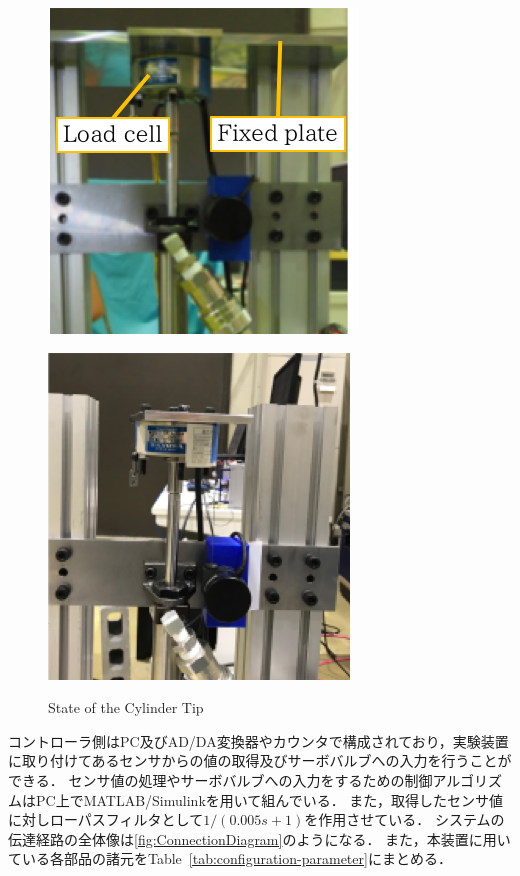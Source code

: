 \begin{figure}[t]
    \begin{minipage}{\minipageratio\hsize}
    \centering
        \includegraphics[keepaspectratio, scale = 1]{contents/SystemIdentification/figure/State_fixed.png}
        \label{fig:State_fixed}
    \end{minipage}
    \begin{minipage}{\minipageratio\hsize}
    \centering
        \includegraphics[keepaspectratio, scale = 1]{contents/SystemIdentification/figure/State_free.png}
        \label{fig:State_free}
    \end{minipage}
    \caption{State of the Cylinder Tip}   
    \label{fig:stateofsystem}
\end{figure}



コントローラ側はPC及びAD/DA変換器やカウンタで構成されており，実験装置に取り付けてあるセンサからの値の取得及びサーボバルブへの入力を行うことができる．
センサ値の処理やサーボバルブへの入力をするための制御アルゴリズムはPC上でMATLAB/Simulinkを用いて組んでいる．
また，取得したセンサ値に対しローパスフィルタとして$1/(0.005s+1)$を作用させている．
システムの伝達経路の全体像は\figname\ref{fig:ConnectionDiagram}のようになる．
また，本装置に用いている各部品の諸元をTable~\ref{tab:configuration-parameter}にまとめる．

